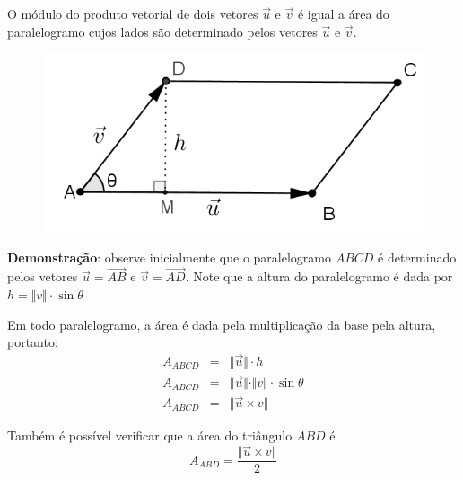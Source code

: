 O módulo do produto vetorial de dois vetores $\vec u$ e $\vec v$ é igual a área do paralelogramo cujos lados são determinado pelos vetores $\vec u$ e $\vec v$.

\begin{figure}[H]
\centering
\includegraphics[width=0.4\linewidth]{analitica/imagens/prodvet.png}
\end{figure}

\textbf{Demonstração}: observe inicialmente que o paralelogramo $ABCD$ é determinado pelos vetores $\vec u=\overrightarrow{AB}$ e $\vec v=\overrightarrow{AD}$. Note que a altura do paralelogramo é dada por $h=\Vert v\Vert\cdot \sin{\theta}$

Em todo paralelogramo, a área é dada pela multiplicação da base pela altura, portanto:
\begin{eqnarray*}
A_{ABCD} & = & \Vert\vec u\Vert\cdot h \\
A_{ABCD} & = & \Vert\vec u\Vert\cdot \Vert v\Vert\cdot \sin{\theta} \\
A_{ABCD} & = & \Vert \vec u \times v \Vert
\end{eqnarray*}

Também é possível verificar que a área do triângulo $ABD$ é $$ A_{ABD}= \frac{\Vert\vec u \times v \Vert}{2}$$